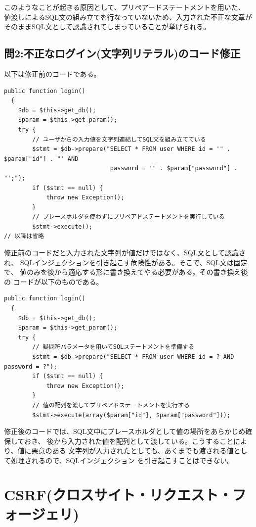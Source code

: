 \documentclass[dvipdfmx,autodetect-engine,titlepage]{jsarticle}
\begin{document}
このようなことが起きる原因として、プリペアードステートメントを用いた、
値渡しによるSQL文の組み立てを行なっていないため、入力された不正な文章が
そのままSQL文として認識されてしまっていることが挙げられる。


\subsection{問2:不正なログイン(文字列リテラル)のコード修正}

以下は修正前のコードである。
\begin{lstlisting}[caption=修正前,label=bank1221.class.php]
  public function login()
  {
    $db = $this->get_db();
    $param = $this->get_param();
    try {
        // ユーザからの入力値を文字列連結してSQL文を組み立てている
        $stmt = $db->prepare("SELECT * FROM user WHERE id = '" . $param["id"] . "' AND
                              password = '" . $param["password"] .  "';");
        if ($stmt == null) {
            throw new Exception();
        }
        // プレースホルダを使わずにプリペアドステートメントを実行している
        $stmt->execute();
// 以降は省略
\end{lstlisting}

修正前のコードだと入力された文字列が値だけではなく、SQL文として認識され、
SQLインジェクションを引き起こす危険性がある。そこで、SQL文は固定で、
値のみを後から適応する形に書き換えてやる必要がある。その書き換え後の
コードが以下のものである。

\begin{lstlisting}[caption=修正後,label=bank1221.class.php]
  public function login()
  {
    $db = $this->get_db();
    $param = $this->get_param();
    try {
        // 疑問符パラメータを用いてSQLステートメントを準備する
        $stmt = $db->prepare("SELECT * FROM user WHERE id = ? AND password = ?");
        if ($stmt == null) {
            throw new Exception();
        }
        // 値の配列を渡してプリペアドステートメントを実行する
        $stmt->execute(array($param["id"], $param["password"]));
\end{lstlisting}

修正後のコードでは、SQL文中にプレースホルダとして値の場所をあらかじめ確保しておき、
後から入力された値を配列として渡している。こうすることにより、値に悪意のある
文字列が入力されたとしても、あくまでも渡される値として処理されるので、SQLインジェクション
を引き起こすことはできない。

\section{CSRF(クロスサイト・リクエスト・フォージェリ)}
\end{document}
